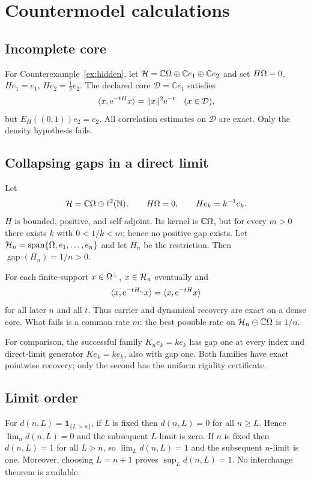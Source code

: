 \section{Countermodel calculations}
\label{app:countermodels}

\subsection{Incomplete core}

For Counterexample~\ref{ex:hidden}, let
$\mathcal H=\mathbb C\Omega\oplus\mathbb C e_1\oplus\mathbb C e_2$ and set
$H\Omega=0$, $He_1=e_1$, $He_2=\tfrac12e_2$.  The declared core
$\mathcal D=\mathbb C e_1$ satisfies
\[
 \langle x,\mathrm e^{-tH}x\rangle=\|x\|^2\mathrm e^{-t}
 \quad(x\in\mathcal D),
\]
but $E_H((0,1))e_2=e_2$.  All correlation estimates on $\mathcal D$ are
exact.  Only the density hypothesis fails.

\subsection{Collapsing gaps in a direct limit}

Let
\[
 \mathcal H=\mathbb C\Omega\oplus\ell^2(\mathbb N),
 \qquad H\Omega=0,\qquad He_k=k^{-1}e_k.
\]
$H$ is bounded, positive, and self-adjoint.  Its kernel is
$\mathbb C\Omega$, but for every $m>0$ there exists $k$ with $0<1/k<m$;
hence no positive gap exists.  Let
$\mathcal H_n=\operatorname{span}\{\Omega,e_1,\ldots,e_n\}$ and let $H_n$ be the
restriction.  Then $\operatorname{gap}(H_n)=1/n>0$.

For each finite-support $x\in\Omega^\perp$, $x\in\mathcal H_n$ eventually and
\[
 \langle x,\mathrm e^{-tH_n}x\rangle
 =\langle x,\mathrm e^{-tH}x\rangle
\]
for all later $n$ and all $t$.  Thus carrier and dynamical recovery are exact
on a dense core.  What fails is a common rate $m$: the best possible rate on
$\mathcal H_n\ominus\mathbb C\Omega$ is $1/n$.

For comparison, the successful family
$K_ne_k=k e_k$ has gap one at every index and direct-limit generator
$Ke_k=k e_k$, also with gap one.  Both families have exact pointwise
recovery; only the second has the uniform rigidity certificate.

\subsection{Limit order}

For $d(n,L)=\mathbf1_{\{L>n\}}$, if $L$ is fixed then $d(n,L)=0$ for all
$n\geq L$.  Hence $\lim_n d(n,L)=0$ and the subsequent $L$-limit is zero.
If $n$ is fixed then $d(n,L)=1$ for all $L>n$, so $\lim_Ld(n,L)=1$ and the
subsequent $n$-limit is one.  Moreover, choosing $L=n+1$ proves
$\sup_Ld(n,L)=1$.  No interchange theorem is available.

